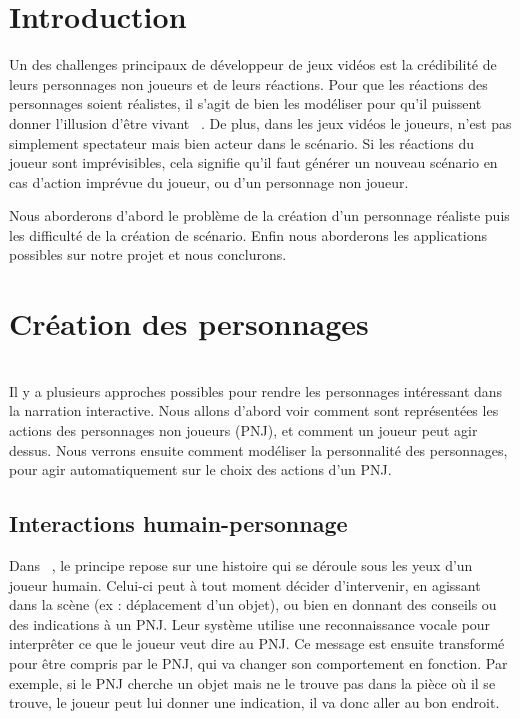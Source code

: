 \documentclass[asi]{picINSA}
\begin{document}
	
	\couverture{}

\tableofcontents{}

\chapter*{Introduction}

Un des challenges principaux de développeur de jeux vidéos est la crédibilité de leurs personnages non joueurs et 
de leurs réactions. Pour que les réactions des personnages soient réalistes, il s'agit de bien les modéliser pour 
qu'il puissent donner l'illusion d'être vivant ~\cite{Bates94therole}. De plus, dans les jeux vidéos le joueurs,
n'est pas simplement spectateur mais bien acteur dans le scénario. Si les réactions du joueur sont imprévisibles,
cela signifie qu'il faut générer un nouveau scénario en cas d'action imprévue du joueur, ou d'un personnage non joueur.

Nous aborderons d'abord le problème de la création d'un personnage réaliste puis les difficulté de la création de scénario.
Enfin nous aborderons les applications possibles sur notre projet et nous conclurons.

\chapter{Création des personnages}
~\\
Il y a plusieurs approches possibles pour rendre les personnages intéressant dans la narration interactive. Nous allons d'abord voir comment sont représentées les actions des personnages non joueurs (PNJ), et comment un joueur peut agir dessus. Nous verrons ensuite comment modéliser la personnalité des personnages, pour agir automatiquement sur le choix des actions d'un PNJ.\\


\section{Interactions humain-personnage}

Dans ~\cite{IRIS:conf/aamas/CavazzaCM2002}, le principe repose sur une histoire qui se déroule sous les yeux d'un joueur humain. Celui-ci peut à tout moment décider d'intervenir, en agissant dans la scène (ex : déplacement d'un objet), ou bien en donnant des conseils ou des indications à un PNJ. Leur système utilise une reconnaissance vocale pour interprêter ce que le joueur veut dire au PNJ. Ce message est ensuite transformé pour être compris par le PNJ, qui va changer son comportement en fonction. Par exemple, si le PNJ cherche un objet mais ne le trouve pas dans la pièce où il se trouve, le joueur peut lui donner une indication, il va donc aller au bon endroit.\\
\end{document}
